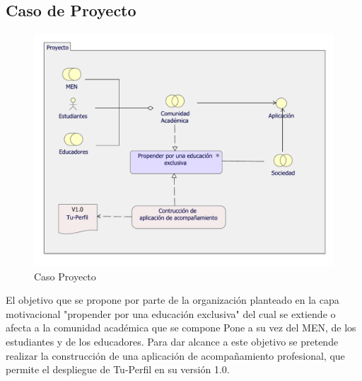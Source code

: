 \subsection{Caso  de Proyecto}
\begin{figure}[h!]
	\centering
	\includegraphics[width=.9\linewidth]{imgs/caso/proyecto/proyecto.pdf}
	\caption{Caso Proyecto}
\end{figure}
El objetivo que se propone por parte de la organización planteado en la capa motivacional "propender por una educación exclusiva" del cual se extiende o afecta a la comunidad académica que se compone Pone a su vez del MEN, de los estudiantes y de los educadores. Para dar alcance a este objetivo se pretende realizar la construcción de una aplicación de acompañamiento profesional, que permite el despliegue de Tu-Perfil en su versión 1.0.